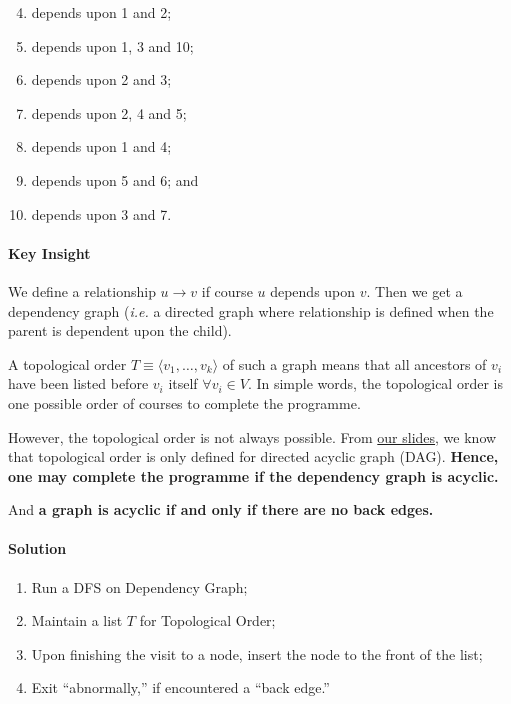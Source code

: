 \documentclass[11pt]{article}
\begin{document}
\begin{enumerate}
\setcounter{enumi}{3}
\item depends upon 1 and 2;
\item depends upon 1, 3 and 10;
\item depends upon 2 and 3;
\item depends upon 2, 4 and 5;
\item depends upon 1 and 4;
\item depends upon 5 and 6; and
\item depends upon 3 and 7.
\end{enumerate}

\paragraph*{Key Insight}
\label{sec:org7f9c803}
We define a relationship \(u\to v\) if course \(u\) depends
upon \(v\).  Then we get a dependency graph (\emph{i.e.} a
directed graph where relationship is defined when the
parent is dependent upon the child).

A topological order \(T\equiv\langle v_{1},\ldots,v_{k}
\rangle\) of such a graph means that all ancestors of
\(v_{i}\) have been listed before \(v_{i}\) itself \(\forall
v_{i}\in V\).  In simple words, the topological order is
one possible order of courses to complete the
programme.

However, the topological order is not always possible.
From \href{https://docs.google.com/presentation/d/14PY-Sc50QsFxdUqZk7GlYVwwEXzO38rg9z9KKx5ti0k/edit\#slide=id.g32a7028b731\_0\_377}{our slides}, we know that topological order is only
defined for directed acyclic graph (DAG).  \textbf{Hence, one
may complete the programme if the dependency graph is
acyclic.}

And \textbf{a graph is acyclic if and only if there are no
back edges.}

\paragraph*{Solution}
\label{sec:org604310f}
\begin{enumerate}
\item Run a DFS on Dependency Graph;
\item Maintain a list \(T\) for Topological Order;
\item Upon finishing the visit to a node, insert the node
to the front of the list;
\item Exit “abnormally,” if encountered a “back edge.”
\end{enumerate}
\end{document}
